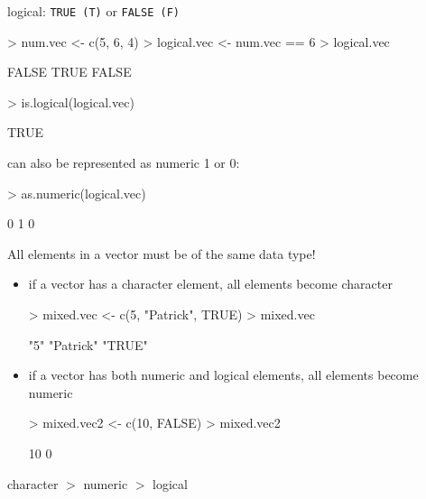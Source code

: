 \documentclass[handout]{beamer}
\newcommand{\red}{\color{red}}
\newcommand{\black}{\color{black}}
\begin{document}
\begin{frame}[fragile]
logical: {\tt TRUE (T)} or {\tt FALSE (F)}
\pause
\bigskip
\red
\begin{Schunk}
\begin{Sinput}
> num.vec <- c(5, 6, 4)
> logical.vec <- num.vec == 6
> logical.vec
\end{Sinput}
\begin{Soutput}
[1] FALSE  TRUE FALSE
\end{Soutput}
\end{Schunk}
\pause
\begin{Schunk}
\begin{Sinput}
> is.logical(logical.vec)
\end{Sinput}
\begin{Soutput}
[1] TRUE
\end{Soutput}
\end{Schunk}
\pause
\black
\bigskip
can also be represented as numeric 1 or 0:
\pause
\red
\bigskip
\begin{Schunk}
\begin{Sinput}
> as.numeric(logical.vec)
\end{Sinput}
\begin{Soutput}
[1] 0 1 0
\end{Soutput}
\end{Schunk}
\black
\end{frame}

\begin{frame}[fragile]
\begin{center}
All elements in a vector must be of the same data type!
\end{center}
\pause
\begin{itemize}
\item if a vector has a character element, all elements become character
\pause
\red
\begin{Schunk}
\begin{Sinput}
> mixed.vec <- c(5, "Patrick", TRUE)
> mixed.vec
\end{Sinput}
\begin{Soutput}
[1] "5"       "Patrick" "TRUE"   
\end{Soutput}
\end{Schunk}
\black
\pause
\bigskip
\item if a vector has both numeric and logical elements, all elements become numeric
\pause
\red
\begin{Schunk}
\begin{Sinput}
> mixed.vec2 <- c(10, FALSE)
> mixed.vec2
\end{Sinput}
\begin{Soutput}
[1] 10  0
\end{Soutput}
\end{Schunk}
\black
\pause
\bigskip
\end{itemize}
\begin{center}
character $>$ numeric $>$ logical
\end{center}

\end{frame}
\end{document}
